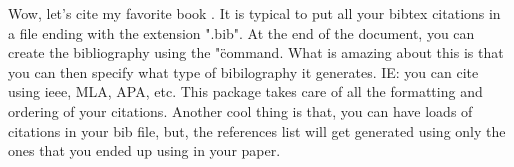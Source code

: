 \documentclass{article} %
\begin{document}
Wow, let's cite my favorite book \cite{DUMMY:1}.
It is typical to put all your bibtex citations in a file ending with the extension ".bib".
At the end of the document, you can create the bibliography using the "\" command.
What is amazing about this is that you can then specify what type of bibilography it generates. IE: you can cite using ieee, MLA, APA, etc. This package takes care of all the formatting and ordering of your citations. Another cool thing is that, you can have loads of citations in your bib file, but, the references list will get generated using only the ones that you ended up using in your paper. 

\newpage

 

\end{document}
